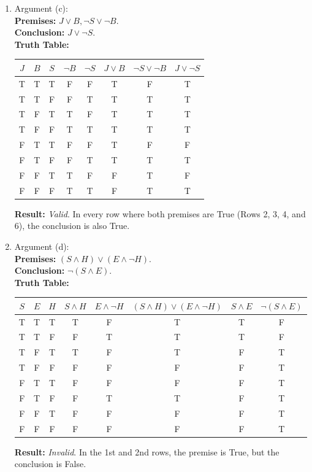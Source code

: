 \begin{enumerate}
\begin{enumerate}
  \item Argument (c): \\
    \textbf{Premises:} $J \lor B, \neg S \lor \neg B$. \\
    \textbf{Conclusion:} $J \lor \neg S$. \\
    \textbf{Truth Table:}
    \begin{center}
      \begin{tabular}{cccccccc}
        $J$ & $B$ & $S$ & $\neg B$ & $\neg S$ & $J \lor B$ & $\neg S \lor \neg B$ & $J \lor \neg S$ \\
        \midrule
        T & T & T & F & F & T & F & T \\
        T & T & F & F & T & T & T & T \\
        T & F & T & T & F & T & T & T \\
        T & F & F & T & T & T & T & T \\
        F & T & T & F & F & T & F & F \\
        F & T & F & F & T & T & T & T \\
        F & F & T & T & F & F & T & F \\
        F & F & F & T & T & F & T & T
      \end{tabular}
    \end{center}
    \textbf{Result:} \emph{Valid}. In every row where both premises are True (Rows 2, 3, 4, and 6), the conclusion is also True.

  \item Argument (d): \\
    \textbf{Premises:} $(S \land H) \lor (E \land \neg H)$. \\
    \textbf{Conclusion:} $\neg(S \land E)$. \\
    \textbf{Truth Table:}
    \begin{center}
      \begin{tabular}{cccccccc}
        $S$ & $E$ & $H$ & $S \land H$ & $E \land \neg H$ & $(S \land H) \lor (E \land \neg H)$ & $S \land E$ & $\neg(S \land E)$ \\
        \midrule
        T & T & T & T & F & T & T & F \\
        T & T & F & F & T & T & T & F \\
        T & F & T & T & F & T & F & T \\
        T & F & F & F & F & F & F & T \\
        F & T & T & F & F & F & F & T \\
        F & T & F & F & T & T & F & T \\
        F & F & T & F & F & F & F & T \\
        F & F & F & F & F & F & F & T
      \end{tabular}
    \end{center}
    \textbf{Result:} \emph{Invalid}. In the 1st and 2nd rows, the premise is True, but the conclusion is False.
  \end{enumerate}


\end{enumerate}
